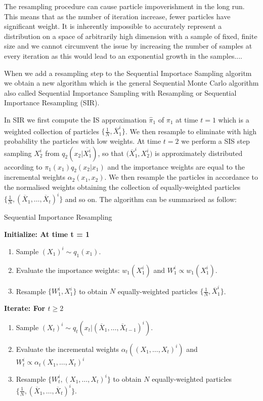 The resampling procedure can cause particle impoverishment in the long run. This means that as the number of iteration increase, fewer particles have significant weight. It is inherently impossible to accurately represent a distribution on a space of arbitrarily high dimension with a sample of fixed, finite size and we cannot circumvent the issue by increasing the number of samples at every iteration as this would lead to an exponential growth in the samples....

When we add a resampling step to the Sequential Importace Sampling algoritm we obtain a new algorithm which is the general Sequential Monte Carlo algorithm also called Sequential Importance Sampling with Resampling or Sequential Importance Resampling (SIR).

In SIR we first compute the IS approximation $\hat{\pi}_1$ of $\pi_1$ at time $t = 1$ which is a weighted collection of particles $\{ \frac{1}{N}, \overline{X}_1^i \}$. We then resample to eliminate with high probability the particles with low weights. At time $t = 2$ we perform a SIS step sampling $X_2^i$ from $q_2(x_2 | \overline{X^i_1})$, so that $\big( \overline{X}_1^i, X^i_2 \big)$ is approximately distributed according to $\pi_1(x_1) q_2(x_2 | x_1)$ and the importance weights are equal to the incremental weights $\alpha_2(x_1, x_2)$. We then resample the particles in accordance to the normalised weights obtaining the collection of equally-weighted particles $\big\{ \frac{1}{N}, (\overline{X}_1, \dots, \overline{X}_t)^i \big\}$ and so on. The algorithm can be summarised as follow:

\begin{algorithm}[H]
\caption{Sequential Importance Resampling}\label{SIR}
    \begin{algorithmic}
        \State  \bf{Initialize:} \normalfont At time t = 1
            \begin{enumerate}
	            \item Sample $(X_{1})^i \sim q_1(x_1)$.
	            \item Evaluate the importance weights: $w_1(X_1^i)$ and $W^i_1 \propto w_1(X_1^i)$.
	            \item Resample $\{ W_1^i, X_1^i \}$ to obtain $N$ equally-weighted particles $\big\{ \frac{1}{N}, \overline{X}_1^i \big\}$.
            \end{enumerate}
        \State  \bf{Iterate:} \normalfont For $t \geq 2$
            \begin{enumerate}
	            \item Sample $(X_{t})^i \sim q_t(x_t | (\overline{X}_1, \dots, \overline{X}_{t-1})^i)$.
	            \item Evaluate the incremental weights $\alpha_t((X_1, \dots, X_t)^i)$ and $W^i_t \propto \alpha_t(X_1, \dots, X_t)^i$
	            \item  Resample $\{ W_t^i, (X_1, \dots, X_t)^i \}$ to obtain $N$ equally-weighted particles $\big\{ \frac{1}{N}, (\overline{X}_1, \dots, \overline{X}_t)^i \big\}$.
	        \end{enumerate}
    \end{algorithmic}
\end{algorithm}

